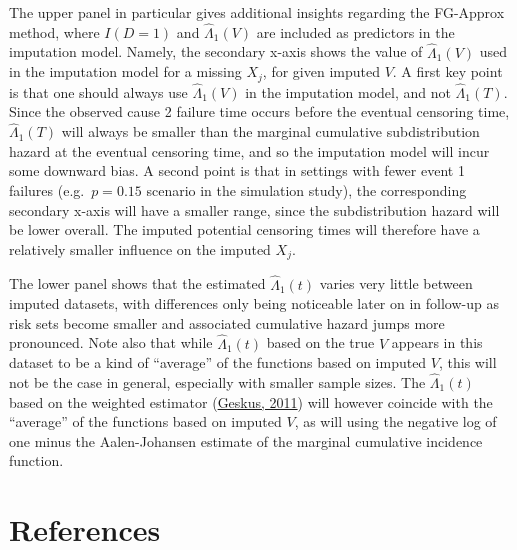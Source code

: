 \documentclass[
  letterpaper,
  DIV=11,
  numbers=noendperiod]{scrreprt}
\begin{document}
The upper panel in particular gives additional insights regarding the
FG-Approx method, where \(I(D = 1)\) and \(\hat{\Lambda}_1(V)\) are
included as predictors in the imputation model. Namely, the secondary
x-axis shows the value of \(\hat{\Lambda}_1(V)\) used in the imputation
model for a missing \(X_j\), for given imputed \(V\). A first key point
is that one should always use \(\hat{\Lambda}_1(V)\) in the imputation
model, and not \(\hat{\Lambda}_1(T)\). Since the observed cause 2
failure time occurs before the eventual censoring time,
\(\hat{\Lambda}_1(T)\) will always be smaller than the marginal
cumulative subdistribution hazard at the eventual censoring time, and so
the imputation model will incur some downward bias. A second point is
that in settings with fewer event 1 failures (e.g.~\(p = 0.15\) scenario
in the simulation study), the corresponding secondary x-axis will have a
smaller range, since the subdistribution hazard will be lower overall.
The imputed potential censoring times will therefore have a relatively
smaller influence on the imputed \(X_j\).

The lower panel shows that the estimated \(\hat{\Lambda}_1(t)\) varies
very little between imputed datasets, with differences only being
noticeable later on in follow-up as risk sets become smaller and
associated cumulative hazard jumps more pronounced. Note also that while
\(\hat{\Lambda}_1(t)\) based on the true \(V\) appears in this dataset
to be a kind of ``average'' of the functions based on imputed \(V\),
this will not be the case in general, especially with smaller sample
sizes. The \(\hat{\Lambda}_1(t)\) based on the weighted estimator
(\protect\hyperlink{ref-geskusCauseSpecificCumulativeIncidence2011}{Geskus,
2011}) will however coincide with the ``average'' of the functions based
on imputed \(V\), as will using the negative log of one minus the
Aalen-Johansen estimate of the marginal cumulative incidence function.

\hypertarget{references-2}{%
\section*{References}\label{references-2}}

\end{document}
